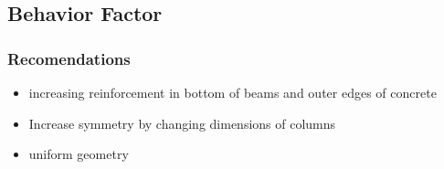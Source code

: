 \documentclass[11pt,a4paper,titlepage]{report}
\makeatletter
\renewcommand\paragraph{\@startsection{paragraph}{5}{\z@}%
  {3.25ex \@plus1ex \@minus.2ex}%
  {-1em}%
  {\normalfont\normalsize\bfseries}}
\makeatother
\begin{document}
\subsection{Behavior Factor}
\subsubsection{Recomendations}
\begin{itemize}
    \item increasing reinforcement in bottom of beams and outer edges of concrete 
    \item Increase symmetry by changing dimensions of columns
    \item uniform geometry
\end{itemize}
\end{document}
